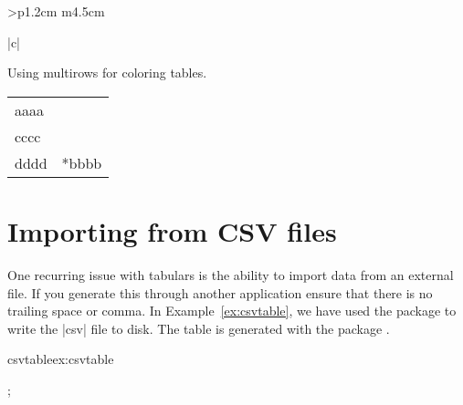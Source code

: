 \begin{tabular}{>{\bfseries}p{1.2cm} m{4.5cm}}
\begin{tabular}[t]{|c|}
\begin{longtable}
Using multirows for coloring tables.

\begin{tabular}{l>{\columncolor{yellow}}l}
aaaa & \\
cccc & \\
dddd & \multirow{-3}*{bbbb}\\
\end{tabular}


\section{Importing from CSV files}

One recurring issue with tabulars is the ability to import
data from an external file. If you generate this through another
application ensure that there is no trailing space or comma. In Example~\ref{ex:csvtable}, we have used the  package
to write the |csv| file to disk. The table is generated with the
package .


\begin{texexample}{csvtable}{ex:csvtable}

; 

\end{texexample}


\end{longtable}
\end{tabular}
\end{tabular}
